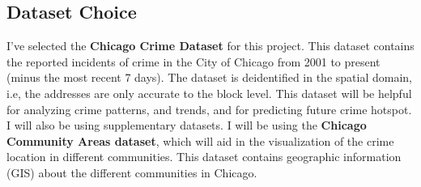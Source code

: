 \documentclass{article}
\begin{document}
\subsection{Dataset Choice}
I’ve selected the \textbf{Chicago Crime Dataset} for this project. This dataset contains the reported incidents of crime in the City of Chicago from 2001 to present (minus the most recent 7 days). The dataset is deidentified in the spatial domain, i.e, the addresses are only accurate to the block level. This dataset will be helpful for analyzing crime patterns, and trends, and for predicting future crime hotspot. 
I will also be using supplementary datasets. I will be using the \textbf{Chicago Community Areas dataset}, which will aid in the visualization of the crime location in different communities. This dataset contains geographic information (GIS) about the different communities in Chicago.
\end{document}
